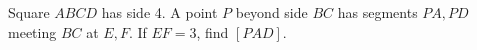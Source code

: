 Square $ABCD$ has side 4. A point $P$ beyond side $BC$ has segments $PA,PD$ meeting $BC$ at $E,F$. If $EF=3$, find $[PAD]$.
